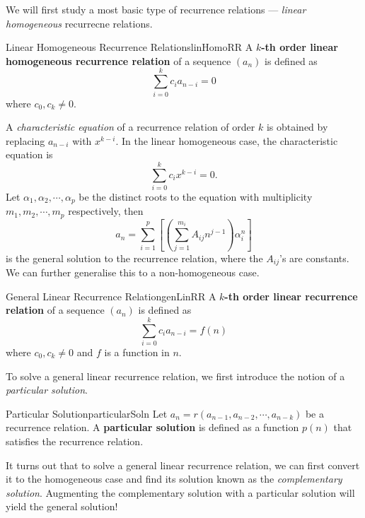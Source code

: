\documentclass[math]{amznotes}
\theoremstyle{remark}
\newcommand{\0}{\mathbf{0}}
\newcommand{\1}{\mathbf{1}}
\begin{document}
We will first study a most basic type of recurrence relations --- \textit{linear homogeneous} recurrecne relations.
\begin{dfnbox}{Linear Homogeneous Recurrence Relations}{linHomoRR}
    A {\color{red} \textbf{$k$-th order linear homogeneous recurrence relation}} of a sequence $(a_n)$ is defined as
    \begin{equation*}
        \sum_{i = 0}^{k}c_ia_{n - i} = 0
    \end{equation*}
    where $c_0, c_k \neq 0$.
\end{dfnbox}
A \textit{characteristic equation} of a recurrence relation of order $k$ is obtained by replacing $a_{n - i}$ with $x^{k - i}$. In the linear homogeneous case, the characteristic equation is 
\begin{equation*}
    \sum_{i = 0}^{k}c_ix^{k - i} = 0.
\end{equation*} 
Let $\alpha_1, \alpha_2, \cdots, \alpha_p$ be the distinct roots to the equation with multiplicity $m_1, m_2, \cdots, m_p$ respectively, then 
\begin{equation*}
    a_n = \sum_{i = 1}^{p}\left[\left(\sum_{j = 1}^{m_i}A_{ij}n^{j - 1}\right)\alpha_i^n\right]
\end{equation*}
is the general solution to the recurrence relation, where the $A_{ij}$'s are constants. We can further generalise this to a non-homogeneous case.
\begin{dfnbox}{General Linear Recurrence Relation}{genLinRR}
    A {\color{red} \textbf{$k$-th order linear recurrence relation}} of a sequence $(a_n)$ is defined as
    \begin{equation*}
        \sum_{i = 0}^{k}c_ia_{n - i} = f(n)
    \end{equation*}
    where $c_0, c_k \neq 0$ and $f$ is a function in $n$.
\end{dfnbox}
To solve a general linear recurrence relation, we first introduce the notion of a \textit{particular solution}.
\begin{dfnbox}{Particular Solution}{particularSoln}
    Let $a_n = r(a_{n - 1}, a_{n - 2}, \cdots, a_{n - k})$ be a recurrence relation. A {\color{red} \textbf{particular solution}} is defined as a function $p(n)$ that satisfies the recurrence relation.
\end{dfnbox}
It turns out that to solve a general linear recurrence relation, we can first convert it to the homogeneous case and find its solution known as the \textit{complementary solution}. Augmenting the complementary solution with a particular solution will yield the general solution!
\end{document}
